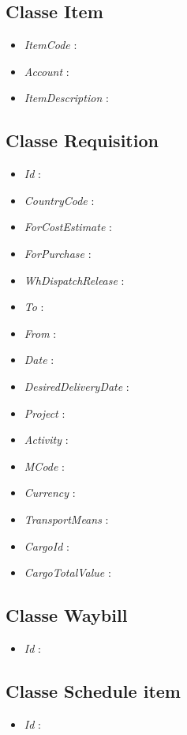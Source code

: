 \subsection{Classe Item}
\begin{itemize}
	\item \textit{ItemCode} :
	\item \textit{Account} :
	\item \textit{ItemDescription} :
\end{itemize}

\subsection{Classe Requisition}
\begin{itemize}
	\item \textit{Id} :
	\item \textit{CountryCode} :
	\item \textit{ForCostEstimate} :
	\item \textit{ForPurchase} :
	\item \textit{WhDispatchRelease} :
	\item \textit{To} :
	\item \textit{From} :
	\item \textit{Date} :
	\item \textit{DesiredDeliveryDate} :
	\item \textit{Project} :
	\item \textit{Activity} :
	\item \textit{MCode} :
	\item \textit{Currency} :
	\item \textit{TransportMeans} :
	\item \textit{CargoId} :
	\item \textit{CargoTotalValue} :
\end{itemize}

\subsection{Classe Waybill}
\begin{itemize}
	\item \textit{Id} :
\end{itemize}

\subsection{Classe Schedule item}
\begin{itemize}
	\item \textit{Id} :
\end{itemize}
